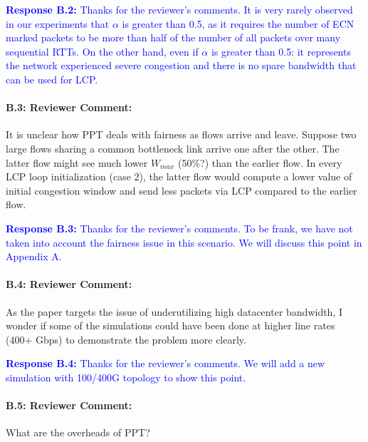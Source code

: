 \documentclass[12pt,one-column]{article}
\begin{document}
\noindent\textcolor{blue}{\textbf{Response B.2:}
Thanks for the reviewer’s comments. 
It is very rarely observed in our experiments that $\alpha$ is greater than 0.5, as it requires the number of ECN marked packets to be more than half of the number of all packets over many sequential RTTs.
On the other hand, even if $\alpha$ is greater than 0.5: it represents the network experienced severe congestion and there is no spare bandwidth that can be used for LCP.
}

{\it \paragraph{B.3: Reviewer Comment:} It is unclear how PPT deals with fairness as flows arrive and leave. Suppose two large flows sharing a common bottleneck link arrive one after the other. The latter flow might see much lower $W_{max}$ (50\%?) than the earlier flow. In every LCP loop initialization (case 2), the latter flow would compute a lower value of initial congestion window and send less packets via LCP compared to the earlier flow.}


\noindent\textcolor{blue}{\textbf{Response B.3:}
Thanks for the reviewer’s comments. 
To be frank, we have not taken into account the fairness issue in this scenario.
We will discuss this point in Appendix A.
}

{\it \paragraph{B.4: Reviewer Comment:} As the paper targets the issue of underutilizing high datacenter bandwidth, I wonder if some of the simulations could have been done at higher line rates (400+ Gbps) to demonstrate the problem more clearly.}


\noindent\textcolor{blue}{\textbf{Response B.4:}
Thanks for the reviewer’s comments. 
We will add a new simulation with 100/400G topology to show this point.
}

{\it \paragraph{B.5: Reviewer Comment:} What are the overheads of PPT?}
\end{document}
